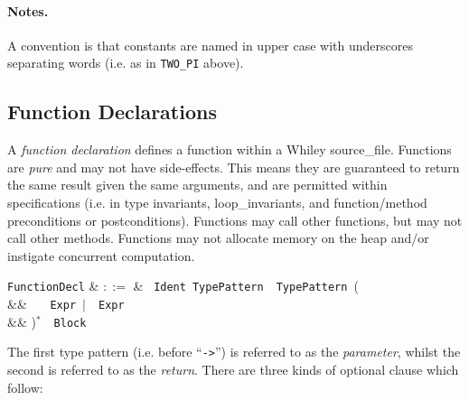 \paragraph{Notes.}  A convention is that constants are named in upper
case with underscores separating words (i.e. as in \lstinline{TWO_PI}
above).


\subsection{Function Declarations}
\label{c_source_files_function_decl}

A {\em function declaration} defines a function within a Whiley \gls{source_file}.  Functions are {\em pure} and may not have side-effects.  This means they are guaranteed to return the same result given the same arguments, and are permitted within specifications (i.e. in type invariants, \gls{loop_invariant}s, and function/method \gls{precondition}s or \gls{postcondition}s).  Functions may call other functions, but may not call other methods.  Functions may not allocate memory on the heap and/or instigate concurrent computation.

\begin{syntax}
  \verb+FunctionDecl+ & $::=$ & \ \verb+Ident+\
  \verb+TypePattern+\ \token{->}\ \verb+TypePattern+\ \big(\\
  && \ \ \ \verb+Expr+\ $|$\ \ \verb+Expr+\\
  && \big)$^*$\ \token{:}\ \verb+Block+\\
\end{syntax}

The first type pattern (i.e. before ``\lstinline{->}'') is referred to as the {\em parameter}, whilst the second is referred to as the {\em return}.  There are three kinds of optional clause which follow:


